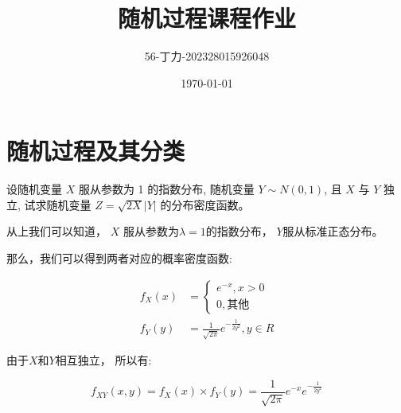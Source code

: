 \documentclass[a4,10pt]{ctexart}
\begin{document}
\title{随机过程课程作业}
\author{56-丁力-202328015926048}
\date{\today}
\maketitle
\tableofcontents
\newpage
{}
\newpage

\section{随机过程及其分类}

\begin{ti}{1}{}

    设随机变量 $X$ 服从参数为 1 的指数分布, 随机变量 $Y \sim N(0,1)$, 
    且 $X$ 与 $Y$ 独立, 试求随机变量 $Z=\sqrt{2 X}|Y|$ 的分布密度函数。
\end{ti}
    \begin{qj}
    

\end{qj}

    从上我们可以知道， $X$ 服从参数为$\lambda=1$的指数分布， 
    $Y$服从标准正态分布。
    
    那么，我们可以得到两者对应的概率密度函数:

    \begin{align}
        f_{X}(x) &= 
        \begin{cases}
            e^{-x} , x>0 \\
            0, \mbox{其他}
        \end{cases}
                \\
        f_{Y}(y) &= \frac{1}{\sqrt{2\pi}} e^{-\frac{1}{2y^2}}, y \in R
    \end{align}

    
    由于$X$和$Y$相互独立， 所以有:

\begin{equation}
    f_{XY}(x,y) = f_X(x) \times f_Y(y) =\frac{1}{\sqrt{2\pi}}  e^{-x} e^{-\frac{1}{2y^2}}
\end{equation}

                                                                                                                                                                                                                                                                                                                                                                                                                                                                                                                                                                                                                                                                                                                                                                                                                                                                                                                                                                                                             
\end{document}
